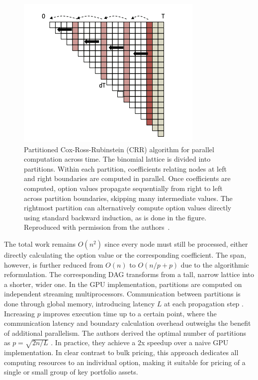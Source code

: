 \documentclass[english,12pt,a4paper,pdftex,sci,utf8]{aaltothesis}
\begin{document}
\begin{figure}[tbp]
    \centering
    \includegraphics[scale=0.8]{External Images/CRRpartitioned.png}
    \caption{Partitioned Cox-Ross-Rubinstein (CRR) algorithm for parallel computation across time. The binomial lattice is divided into partitions. Within each partition, coefficients relating nodes at left and right boundaries are computed in parallel. Once coefficients are computed, option values propagate sequentially from right to left across partition boundaries, skipping many intermediate values. The rightmost partition can alternatively compute option values directly using standard backward induction, as is done in the figure. Reproduced with permission from the authors~\cite{ganesan2009acceleration}.}

    \label{fig:partitioned}
\end{figure}

The total work remains $O(n^2)$ since every node must still be processed, either directly calculating the option value or the corresponding coefficient. The span, however, is further reduced from $O(n)$ to $O(n/p + p)$ due to the algorithmic reformulation. The corresponding DAG transforms from a tall, narrow lattice into a shorter, wider one. In the GPU implementation, partitions are computed on independent streaming multiprocessors. Communication between partitions is done through global memory, introducing latency $L$ at each propagation step \cite{ganesan2009acceleration}. Increasing $p$ improves execution time up to a certain point, where the communication latency and boundary calculation overhead outweighs the benefit of additional parallelism. The authors derived the optimal number of partitions as $p = \sqrt{2n/L}$ \cite{ganesan2009acceleration}. In practice, they achieve a 2x speedup over a naive GPU implementation. In clear contrast to bulk pricing, this approach dedicates all computing resources to an individual option, making it suitable for pricing of a single or small group of key portfolio assets.
\clearpage
\end{document}
